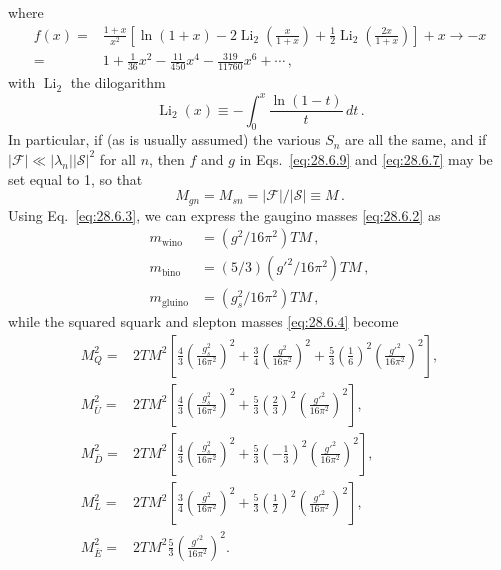 where
\begin{equation}
  \begin{aligned}
    f(x)={}&\frac{1+x}{x^2}
    \left[
      \ln(1+x)
      -2\operatorname{Li}_2\left(\frac{x}{1+x}\right)
      +\frac{1}{2}\operatorname{Li}_2\left(\frac{2x}{1+x}\right)
    \right]
    +x\longrightarrow -x\\
    ={}&1+\frac{1}{36}x^2-\frac{11}{450}x^4
      -\frac{319}{11760}x^6+\cdots\,,
  \end{aligned}
  \tag{28.6.10}\label{eq:28.6.10}
\end{equation}
with \(\operatorname{Li}_2\) the dilogarithm
\begin{equation}
  \operatorname{Li}_2(x)\equiv-\int_0^x\frac{\ln(1-t)}{t}\,dt\,.
  \tag{28.6.11}\label{eq:28.6.11}
\end{equation}
In particular, if (as is usually assumed) the various \(S_n\) are all the
same, and if
\(\lvert\mathcal{F}\rvert\ll
\lvert\lambda_n\rvert\lvert\mathcal{S}\rvert^2\) for all \(n\), then
\(f\) and \(g\) in Eqs.~\eqref{eq:28.6.9} and \eqref{eq:28.6.7} may be
set equal to 1, so that
\begin{equation}
  M_{gn}=M_{sn}
  =\lvert\mathcal{F}\rvert/\lvert\mathcal{S}\rvert\equiv M\,.
  \tag{28.6.12}\label{eq:28.6.12}
\end{equation}
Using Eq.~\eqref{eq:28.6.3}, we can express the gaugino masses
\eqref{eq:28.6.2} as
\begin{equation}
  \begin{aligned}
    m_{\mathrm{wino}}&=(g^2/16\pi^2)TM\,,\\
    m_{\mathrm{bino}}&=(5/3)(g'^2/16\pi^2)TM\,,\\
    m_{\mathrm{gluino}}&=(g_s^2/16\pi^2)TM\,,
  \end{aligned}
  \tag{28.6.13}\label{eq:28.6.13}
\end{equation}
while the squared squark and slepton masses \eqref{eq:28.6.4} become
\begin{equation}
  \begin{aligned}
    M_Q^2={}&2TM^2
      \left[
        \frac{4}{3}\left(\frac{g_s^2}{16\pi^2}\right)^2
        +\frac{3}{4}\left(\frac{g^2}{16\pi^2}\right)^2
        +\frac{5}{3}\left(\frac{1}{6}\right)^2
          \left(\frac{g'^2}{16\pi^2}\right)^2
      \right],\\
    M_{\bar U}^2={}&2TM^2
      \left[
        \frac{4}{3}\left(\frac{g_s^2}{16\pi^2}\right)^2
        +\frac{5}{3}\left(\frac{2}{3}\right)^2
          \left(\frac{g'^2}{16\pi^2}\right)^2
      \right],\\
    M_{\bar D}^2={}&2TM^2
      \left[
        \frac{4}{3}\left(\frac{g_s^2}{16\pi^2}\right)^2
        +\frac{5}{3}\left(-\frac{1}{3}\right)^2
          \left(\frac{g'^2}{16\pi^2}\right)^2
      \right],\\
    M_L^2={}&2TM^2
      \left[
        \frac{3}{4}\left(\frac{g^2}{16\pi^2}\right)^2
        +\frac{5}{3}\left(\frac{1}{2}\right)^2
          \left(\frac{g'^2}{16\pi^2}\right)^2
      \right],\\
    M_{\bar E}^2={}&2TM^2\frac{5}{3}
      \left(\frac{g'^2}{16\pi^2}\right)^2 .
  \end{aligned}
  \tag{28.6.14}\label{eq:28.6.14}
\end{equation}
